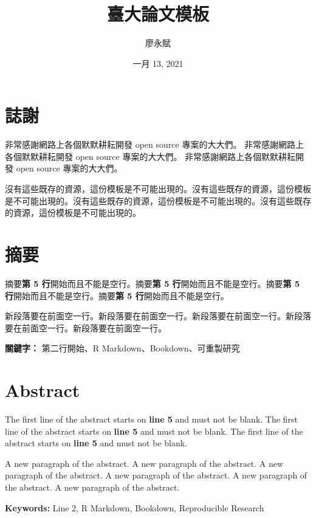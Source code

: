 \documentclass[oneside]{book}
\title{臺大論文模板}
\author{廖永賦}
\date{一月 13, 2021}
\begin{document}


\clearpage
{}

{}



\chapter*{誌謝}
非常感謝網路上各個默默耕耘開發 open source 專案的大大們。
非常感謝網路上各個默默耕耘開發 open source 專案的大大們。
非常感謝網路上各個默默耕耘開發 open source 專案的大大們。

沒有這些既存的資源，這份模板是不可能出現的。沒有這些既存的資源，這份模板是不可能出現的。沒有這些既存的資源，這份模板是不可能出現的。沒有這些既存的資源，這份模板是不可能出現的。


\chapter*{摘要}
摘要\textbf{第 5 行}開始而且不能是空行。摘要\textbf{第 5 行}開始而且不能是空行。摘要\textbf{第 5 行}開始而且不能是空行。摘要\textbf{第 5 行}開始而且不能是空行。

新段落要在前面空一行。新段落要在前面空一行。新段落要在前面空一行。新段落要在前面空一行。新段落要在前面空一行。
\bigbreak

\noindent
\textbf{關鍵字：} 第二行開始、R Markdown、Bookdown、可重製研究

\chapter*{Abstract}
The first line of the abstract starts on \textbf{line 5} and must not be blank. The first line of the abstract starts on \textbf{line 5} and must not be blank. The first line of the abstract starts on \textbf{line 5} and must not be blank.

A new paragraph of the abstract. A new paragraph of the abstract. A new paragraph of the abstract. A new paragraph of the abstract. A new paragraph of the abstract. A new paragraph of the abstract.
\bigbreak

\noindent
\textbf{Keywords:} Line 2, R Markdown, Bookdown, Reproducible Research
\end{document}
